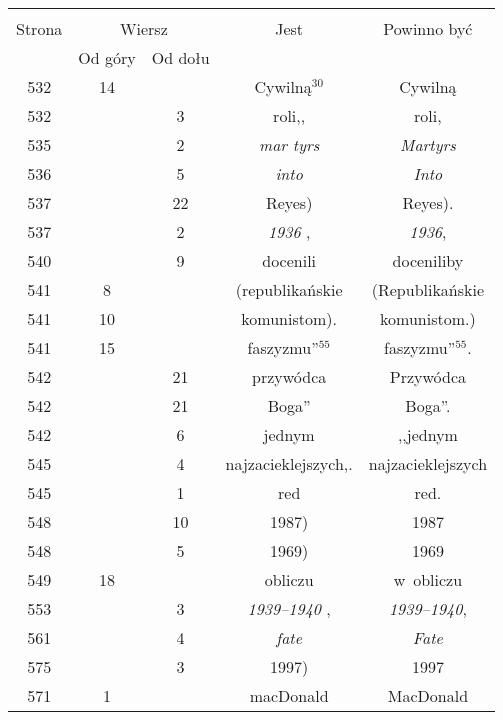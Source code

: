 \documentclass[a4paper,11pt]{article}
\begin{document}
\begin{center}
  \begin{tabular}{|c|c|c|c|c|}
    \hline
    & \multicolumn{2}{c|}{} & & \\
    Strona & \multicolumn{2}{c|}{Wiersz} & Jest
                              & Powinno być \\ \cline{2-3}
    & Od góry & Od dołu & & \\
    \hline
    532 & 14 & & Cywilną$^{ 30 }$ & Cywilną \\
    532 & &  3 & roli,,  %
           & roli, \\
    535 & &  2 & \emph{mar tyrs} & \emph{Martyrs} \\
    536 & &  5 & \emph{into} & \emph{Into} \\
    537 & & 22 & Reyes)\tb{.} & Reyes). \\
    537 & &  2 & \emph{1936} , & \emph{1936}, \\
    540 & &  9 & docenili & doceniliby \\
    541 &  8 & & (republikańskie & (Republikańskie \\
    541 & 10 & & komunistom). & komunistom.) \\
    541 & 15 & & faszyzmu''$^{ 55 }$\tb{.} & faszyzmu''$^{ 55 }$. \\
    542 & & 21 & przywódca & Przywódca \\
    542 & & 21 & Boga'' & Boga''. \\
    542 & &  6 & jednym & ,,jednym  %
    \\
    545 & &  4 & najzacieklejszych,. & najzacieklejszych \\
    545 & &  1 & red & red. \\
    548 & & 10 & 1987) & 1987 \\
    548 & &  5 & 1969) & 1969 \\
    549 & 18 & & obliczu & w~obliczu \\
    553 & &  3 & \emph{1939--1940} , & \emph{1939--1940}, \\
    561 & &  4 & \emph{fate} & \emph{Fate} \\
    575 & &  3 & 1997) & 1997 \\
    571 &  1 & & macDonald & MacDonald \\
    \hline
  \end{tabular}


\end{center}
\end{document}
